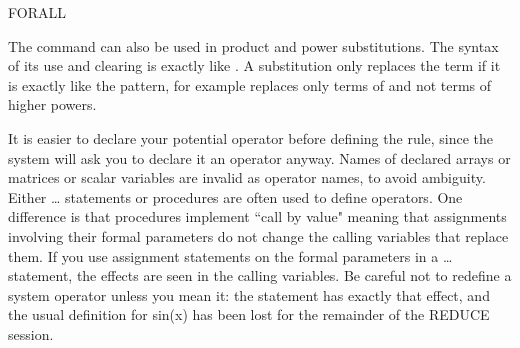 \begin{Command}[forall]{FORALL}
\begin{Comments}
The  command can also be used in product and power substitutions.
The syntax of its use and clearing is exactly like .  A 
substitution only replaces the term if it is exactly like the pattern, for
example  replaces only terms of  and not
terms of higher powers.

It is easier to declare your potential operator before defining the 
 rule, since the system will ask you to declare it an
operator anyway.  Names of declared arrays or matrices or scalar
variables are invalid as operator names, to avoid ambiguity.  Either
\ldots{} statements or procedures are often used to define
operators.  One difference is that procedures implement ``call by value"
meaning that assignments involving their formal parameters do not change
the calling variables that replace them.  If you use assignment statements
on the formal parameters in a \ldots{} statement, the
effects are seen in the calling variables.  Be careful not to redefine a
system operator unless you mean it: the statement  has exactly that effect, and the usual definition for sin(x) has
been lost for the remainder of the REDUCE session. \end{Comments}
\end{Command}

